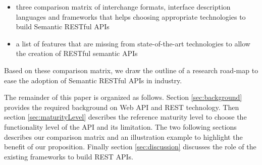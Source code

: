 \begin{itemize}
    \item three comparison matrix of interchange formats, interface description languages and frameworks that helps choosing appropriate technologies to build Semantic RESTful APIs
    \item a list of features that are missing from state-of-the-art technologies to allow the creation of RESTful semantic APIs
\end{itemize}

Based on these comparison matrix, we draw the outline of a research road-map to ease the adoption of Semantic RESTful APIs in industry.

The remainder of this paper is organized as follows. Section \ref{sec:background} provides the required background on Web API and REST technology. Then section \ref{sec:maturityLevel} describes the reference maturity level to choose the functionality level of the API and its limitation. The two following sections describes our comparison matrix and an illustration example to highlight the benefit of our proposition. Finally section \ref{sec:discussion} discusses the role of the existing frameworks to build REST APIs. 







